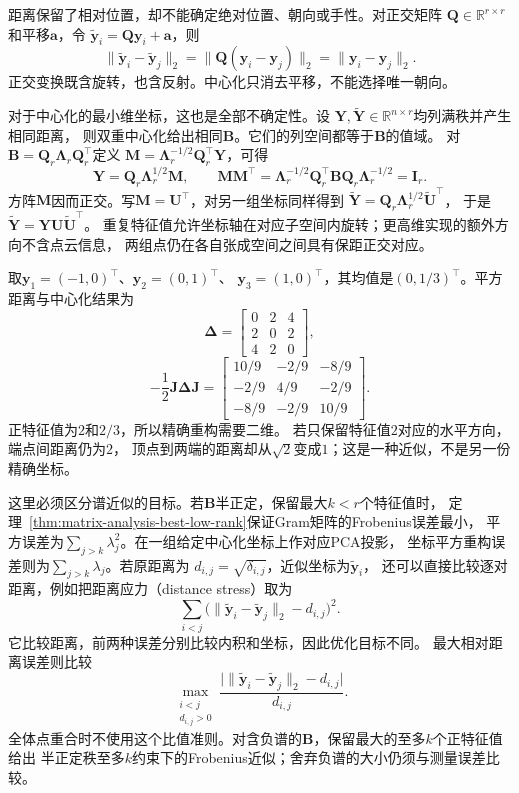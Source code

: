 距离保留了相对位置，却不能确定绝对位置、朝向或手性。对正交矩阵
$\bm Q\in\mathbb R^{r\times r}$和平移$\bm a$，令
$\widetilde{\bm y}_i=\bm Q\bm y_i+\bm a$，则
\[
 \lVert\widetilde{\bm y}_i-\widetilde{\bm y}_j\rVert_2
 =\lVert\bm Q(\bm y_i-\bm y_j)\rVert_2
 =\lVert\bm y_i-\bm y_j\rVert_2.
\]
正交变换既含旋转，也含反射。中心化只消去平移，不能选择唯一朝向。

对于中心化的最小维坐标，这也是全部不确定性。设
$\bm Y,\widetilde{\bm Y}\in\mathbb R^{n\times r}$均列满秩并产生相同距离，
则双重中心化给出相同$\bm B$。它们的列空间都等于$\bm B$的值域。
对$\bm B=\bm Q_r\bm\Lambda_r\bm Q_r^\top$定义
$\bm M=\bm\Lambda_r^{-1/2}\bm Q_r^\top\bm Y$，可得
\[
 \bm Y=\bm Q_r\bm\Lambda_r^{1/2}\bm M,\qquad
 \bm M\bm M^\top
 =\bm\Lambda_r^{-1/2}\bm Q_r^\top\bm B\bm Q_r
   \bm\Lambda_r^{-1/2}=\bm I_r.
\]
方阵$\bm M$因而正交。写$\bm M=\bm U^\top$，对另一组坐标同样得到
$\widetilde{\bm Y}=\bm Q_r\bm\Lambda_r^{1/2}\widetilde{\bm U}^\top$，
于是$\widetilde{\bm Y}=\bm Y\bm U\widetilde{\bm U}^\top$。
重复特征值允许坐标轴在对应子空间内旋转；更高维实现的额外方向不含点云信息，
两组点仍在各自张成空间之间具有保距正交对应。

\begin{example}[三个点能否放在一条直线上]
\label{ex:geometry-three-point-embedding}
取$\bm y_1=(-1,0)^\top$、$\bm y_2=(0,1)^\top$、
$\bm y_3=(1,0)^\top$，其均值是$(0,1/3)^\top$。平方距离与中心化结果为
\[
 \bm\Delta=\begin{bmatrix}0&2&4\\2&0&2\\4&2&0\end{bmatrix},
\]
\begin{equation}
 -\frac12\bm J\bm\Delta\bm J
 =\begin{bmatrix}
  10/9&-2/9&-8/9\\
  -2/9&4/9&-2/9\\
  -8/9&-2/9&10/9
 \end{bmatrix}.
 \label{eq:geometry-three-point-centered-gram}
\end{equation}
正特征值为$2$和$2/3$，所以精确重构需要二维。
若只保留特征值$2$对应的水平方向，端点间距离仍为$2$，
顶点到两端的距离却从$\sqrt2$变成$1$；这是一种近似，不是另一份精确坐标。
\end{example}

这里必须区分谱近似的目标。若$\bm B$半正定，保留最大$k<r$个特征值时，
定理~\ref{thm:matrix-analysis-best-low-rank}保证Gram矩阵的Frobenius误差最小，
平方误差为$\sum_{j>k}\lambda_j^2$。在一组给定中心化坐标上作对应PCA投影，
坐标平方重构误差则为$\sum_{j>k}\lambda_j$。若原距离为
$d_{i,j}=\sqrt{\delta_{i,j}}$，近似坐标为$\widetilde{\bm y}_i$，
还可以直接比较逐对距离，例如把距离应力（distance stress）取为
\[
 \sum_{i<j}
 \bigl(\lVert\widetilde{\bm y}_i-\widetilde{\bm y}_j\rVert_2-d_{i,j}\bigr)^2.
\]
它比较距离，前两种误差分别比较内积和坐标，因此优化目标不同。
最大相对距离误差则比较
\[
 \max_{\substack{i<j\\d_{i,j}>0}}
 \frac{\bigl|\lVert\widetilde{\bm y}_i-\widetilde{\bm y}_j\rVert_2-d_{i,j}\bigr|}
 {d_{i,j}}.
\]
全体点重合时不使用这个比值准则。对含负谱的$\bm B$，保留最大的至多$k$个正特征值给出
半正定秩至多$k$约束下的Frobenius近似；舍弃负谱的大小仍须与测量误差比较。

